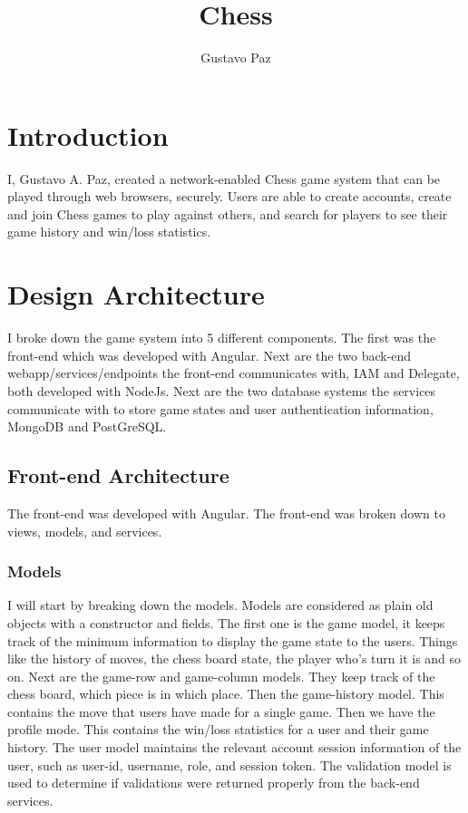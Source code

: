 \documentclass[12pt]{article}
\title{Chess}
\author{Gustavo Paz}
\begin{document}
\maketitle
\section{Introduction}
I, Gustavo A. Paz, created a network-enabled Chess game system that can be played 
through web browsers, securely. Users are able to create accounts, create 
and join Chess games to play against others, and search for players 
to see their game history and win/loss statistics. 
\maketitle
\section{Design Architecture}
I broke down the game system into 5 different components. The first was the front-end 
which was developed with Angular. Next are the two back-end webapp/services/endpoints the front-end
communicates with, IAM and Delegate, both developed with NodeJs. Next are the two database systems
the services communicate with to store game states and user authentication information, MongoDB 
and PostGreSQL.
\subsection{Front-end Architecture}
The front-end was developed with Angular. The front-end was broken down to views, models, and services.

\subsubsection{Models}
I will start by breaking down the models. Models are considered as plain old objects with a constructor 
and fields. The first one is the game model, it keeps track of the minimum information to display the game 
state to the users. Things like the history of moves, the chess board state, the player who's turn it is 
and so on. Next are the game-row and game-column models. They keep track of the chess board, which piece 
is in which place. Then the game-history model. This contains the move that users have made for a single 
game. Then we have the profile mode. This contains the win/loss statistics for a user and their game history. 
The user model maintains the relevant account session information of the user, such as user-id, username, role, and 
session token. The validation model is used to determine if validations were returned properly from the back-end services.
\end{document}
